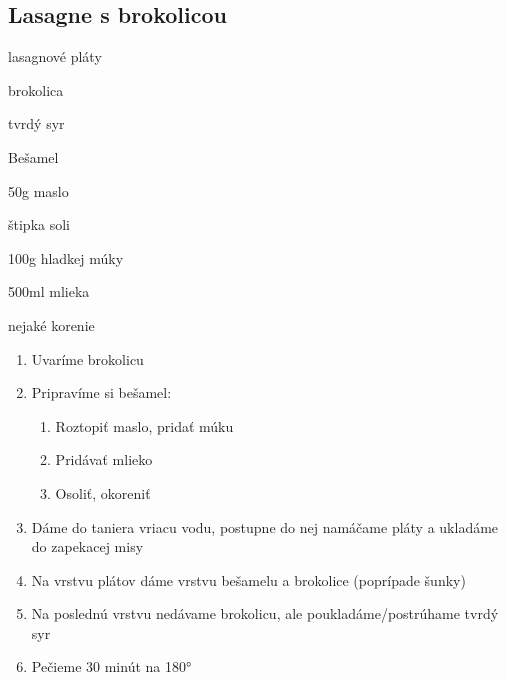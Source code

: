 \setcounter{step}{0}
\subsection{Lasagne s brokolicou}

\begin{ingredient}
\def\portions{4}%

\begin{main}
	\item lasagnové pláty
	\item brokolica
	\item tvrdý syr
\end{main}
\begin{subingredient}{Bešamel}
	\item 50g maslo
	\item štipka soli
	\item 100g hladkej múky
	\item 500ml mlieka
	\item nejaké korenie
\end{subingredient}
\end{ingredient}
\begin{recipe}

\begin{enumerate}

\item{Uvaríme brokolicu}
\item{Pripravíme si bešamel:}
\begin{enumerate}
\item{Roztopiť maslo, pridať múku}
\item{Pridávať mlieko}
\item{Osoliť, okoreniť}
\end{enumerate}

\item{Dáme do taniera vriacu vodu, postupne do nej namáčame pláty a ukladáme do zapekacej misy}
\item{Na vrstvu plátov dáme vrstvu bešamelu a brokolice (poprípade šunky)}
\item{Na poslednú vrstvu nedávame brokolicu, ale poukladáme/postrúhame tvrdý syr}
\item{Pečieme 30 minút na 180°}

\end{enumerate}
\end{recipe}

\begin{notes}

\end{notes}
\clearpage	